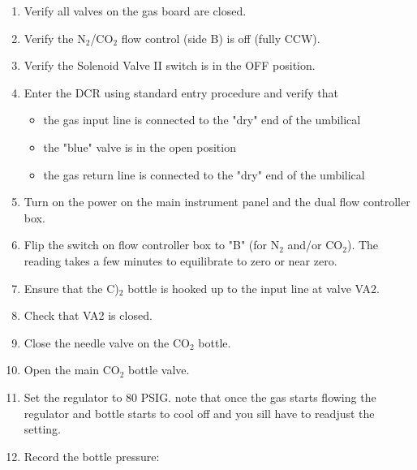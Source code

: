 \begin{enumerate}
\item \CheckBox[name=gbsp1]{} Verify all valves on the gas board are closed.
\item \CheckBox[name=gbsp2]{} Verify the N$_{2}$/CO$_{2}$ flow control (side B) is off (fully CCW).
\item \CheckBox[name=gbsp3]{} Verify the Solenoid Valve II switch is in the OFF position.
\item \CheckBox[name=gbsp4]{} Enter the DCR using standard entry procedure and verify that
\begin{itemize}
\item \CheckBox[name=gbsp4a]{} the gas input line is connected to the "dry" end of the umbilical
\item \CheckBox[name=gbsp4b]{} the "blue" valve is in the open position
\item \CheckBox[name=gbsp4c]{} the gas return line is connected to the "dry" end of the umbilical 
\end{itemize}
\item \CheckBox[name=gbsp5]{} Turn on the power on the main instrument panel and the dual flow controller box.
\item \CheckBox[name=gbsp6]{} Flip the switch on flow controller box to "B" (for N$_{2}$ and/or CO$_{2}$). The reading takes a few minutes to equilibrate to zero or near zero.
\item \CheckBox[name=gbsp7]{} Ensure that the C)$_{2}$ bottle is hooked up to the input line at valve VA2.
\item \CheckBox[name=gbsp8]{} Check that VA2 is closed.
\item \CheckBox[name=gbsp9]{} Close the needle valve on the CO$_2$ bottle.
\item \CheckBox[name=gbsp10]{} Open the main CO$_2$ bottle valve.
\item \CheckBox[name=gbsp11]{} Set the regulator to 80 PSIG. note that once the gas starts flowing the regulator and bottle starts to cool off and you sill have to readjust the setting.
\item \CheckBox[name=gbsp12]{} Record the bottle pressure:

\end{enumerate}
